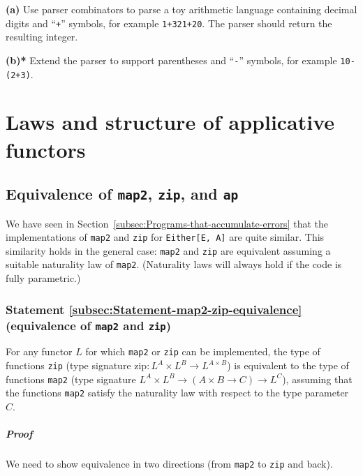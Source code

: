 \textbf{(a)} Use parser combinators to parse a toy arithmetic language
containing decimal digits and \textsf{``}\lstinline!+!\textsf{''} symbols, for example
\lstinline!1+321+20!. The parser should return the resulting integer.

\textbf{(b){*}} Extend the parser to support parentheses and \textsf{``}\lstinline!-!\textsf{''}
symbols, for example \lstinline!10-(2+3)!.

\section{Laws and structure of applicative functors}

\subsection{Equivalence of \texttt{map2}, \texttt{zip}, and \texttt{ap}\label{subsec:Equivalence-of-map2-zip-ap}}

We have seen in Section~\ref{subsec:Programs-that-accumulate-errors}
that the implementations of \lstinline!map2! and \lstinline!zip!
for \lstinline!Either[E, A]! are quite similar. This similarity holds
in the general case: \lstinline!map2! and \lstinline!zip! are equivalent
assuming a suitable naturality law of \lstinline!map2!. (Naturality
laws will always hold if the code is fully parametric.)

\subsubsection{Statement \label{subsec:Statement-map2-zip-equivalence}\ref{subsec:Statement-map2-zip-equivalence}
(equivalence of \lstinline!map2! and \lstinline!zip!)}

For any functor $L$ for which \lstinline!map2! or \lstinline!zip!
can be implemented, the type of functions \lstinline!zip! (type signature
$\text{zip}:L^{A}\times L^{B}\rightarrow L^{A\times B}$) is equivalent
to the type of functions \lstinline!map2! (type signature $L^{A}\times L^{B}\rightarrow\left(A\times B\rightarrow C\right)\rightarrow L^{C}$),
assuming that the functions \lstinline!map2! satisfy the naturality
law with respect to the type parameter $C$.

\subparagraph{Proof}

We need to show equivalence in two directions (from \lstinline!map2!
to \lstinline!zip! and back).

